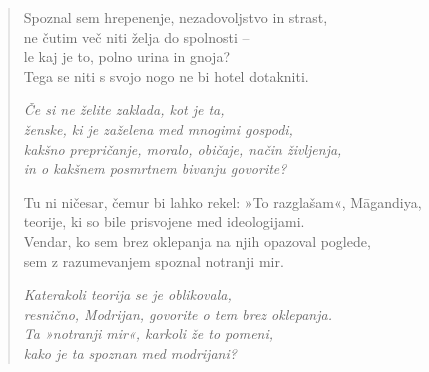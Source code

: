 \begin{verse}


Spoznal sem hrepenenje, nezadovoljstvo in strast,\\
ne čutim več niti želja do spolnosti --\\
le kaj je to, polno urina in gnoja?\\
Tega se niti s svojo nogo ne bi hotel dotakniti.

\emph{Če si ne želite zaklada, kot je ta,\\
ženske, ki je zaželena med mnogimi gospodi,\\
kakšno prepričanje, moralo, običaje, način življenja,\\
in o kakšnem posmrtnem bivanju govorite?}

Tu ni ničesar, čemur bi lahko rekel: »To razglašam«, Māgandiya,\\
teorije, ki so bile prisvojene med ideologijami.\\
Vendar, ko sem brez oklepanja na njih opazoval poglede,\\
sem z razumevanjem spoznal notranji mir.

\emph{Katerakoli teorija se je oblikovala,\\
resnično, Modrijan, govorite o tem brez oklepanja.\\
Ta »notranji mir«, karkoli že to pomeni,\\
kako je ta spoznan med modrijani?}

\end{verse}


